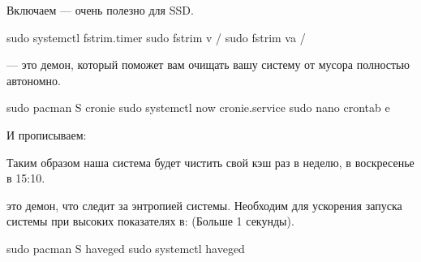 \documentclass[letterpaper,10pt,russian,openany]{sphinxmanual}
\begin{document}
\sphinxAtStartPar
{} Включаем  — очень полезно для SSD.

\begin{sphinxVerbatim}[commandchars=\\\{\}]
sudo systemctl  fstrim.timer    
sudo fstrim \PYGZhy{}v /                      
sudo fstrim \PYGZhy{}va /                     
\end{sphinxVerbatim}

\sphinxAtStartPar
{}  — это демон, который поможет вам очищать вашу систему от мусора полностью автономно.

\begin{sphinxVerbatim}[commandchars=\\\{\}]
sudo pacman \PYGZhy{}S cronie                         
sudo systemctl  \PYGZhy{}\PYGZhy{}now cronie.service    
sudo nano crontab \PYGZhy{}e                   
\end{sphinxVerbatim}

\sphinxAtStartPar
И прописываем:

\sphinxAtStartPar
{}

\sphinxAtStartPar
Таким образом наша система будет чистить свой кэш раз в неделю, в воскресенье в 15:10.

\sphinxAtStartPar
{}  \sphinxhyphen{} это демон, что следит за энтропией системы.
Необходим для ускорения запуска системы при высоких показателях в:  (Больше 1 секунды).

\begin{sphinxVerbatim}[commandchars=\\\{\}]
sudo pacman \PYGZhy{}S haveged        
sudo systemctl  haveged 
\end{sphinxVerbatim}
\end{document}
